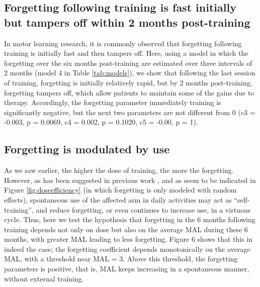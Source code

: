 \subsection{Forgetting following training is fast initially but tampers off within 2 months post-training}
In motor learning research, it is commonly observed that forgetting following training is initially fast and then tampers off. 
Here, using a model in which the forgetting over the six months post-training are estimated over three intervals of 2 months (model 4 in Table \ref{tab:models}), we show that following the last session of training, forgetting is initially relatively rapid, but by 2 months post-training, forgetting tampers off, which allow patients to maintain some of the gains due to therapy. 
Accordingly, the forgetting parameter immediately training is significantly negative, but the next two parameters are not different from 0 (c3 = -0.003, p = 0.0069, c4 = 0.002, p = 0.1020, c5 = -0.00, p = 1).

\subsection{Forgetting is modulated by use}
As we saw earlier, the higher the dose of training, the more the forgetting. 
However, as has been suggested in previous work \cite{Schweighofer2009}, and as seem to be indicated in Figure \ref{fig:doseefficiency} (in which forgetting is only modeled with random effects), spontaneous use of the affected arm in daily activities may act as “self-training”, and reduce forgetting, or even continues to increase use, in a virtuous cycle. 
Thus, here we test the hypothesis that forgetting in the 6 months following training depends not only on dose but also on the average MAL during these 6 months, with greater MAL leading to less forgetting. 
Figure 6 shows that this in indeed the case; the forgetting coefficient depends monotonically on the average MAL, with a threshold near MAL = 3. 
Above this threshold, the forgetting parameters is positive, that is, MAL keeps increasing in a spontaneous manner, without external training.

